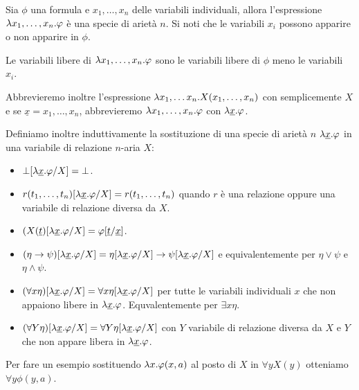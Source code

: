 \documentclass[]{marticle}
\begin{document}
\begin{block}[Definizione]
    Sia $\phi$ una formula e $x_1, \dots, x_n$ delle variabili individuali,
    allora l'espressione $\lambda x_1, \dots, x_n.\varphi$ \`e una specie di ariet\`a
    $n$. Si noti che le variabili $x_i$ possono apparire o non apparire in
    $\phi$. 

    Le variabili libere di $\lambda x_1, \dots, x_n.\varphi$ sono le variabili libere di
    $\phi$ meno le variabili $x_i$.

    Abbrevieremo inoltre l'espressione $\lambda x_1, \dots x_n.X(x_1, \dots, x_n)$
    con semplicemente $X$ e se $\underline{x}=x_1,\dots, x_n$, abbrevieremo $\lambda
    x_1, \dots, x_n.\varphi$ con $\lambda\underline{x}.\varphi$.

    Definiamo inoltre induttivamente la sostituzione di una specie di ariet\`a
    $n$ $\lambda\underline{x}.\varphi$ in una variabile di relazione $n$-aria $X$:
    \begin{itemize}
        \item $\bot[\lambda\underline{x}.\varphi/X] = \bot$.
        \item $r(t_1, \dots, t_n)[\lambda\underline{x}.\varphi/X] = r(t_1, \dots,
            t_n)$ quando $r$ \`e una relazione oppure una variabile di relazione
            diversa da $X$.
        \item $(X(\underline{t})[\lambda\underline{x}.\varphi/X] =
            \varphi[\underline{t}/\underline{x}]$.
        \item $(\eta\rightarrow\psi)[\lambda\underline{x}.\varphi/X] =
            \eta[\lambda\underline{x}.\varphi/X] \rightarrow
            \psi[\lambda\underline{x}.\varphi/X]$
            e equivalentemente per $\eta\lor\psi$ e $\eta\land\psi$.
        \item $(\forall x \eta)[\lambda\underline{x}.\varphi/X] = \forall x
            \eta[\lambda\underline{x}.\varphi/X]$ per tutte le variabili
            individuali $x$ che non appaiono libere in $\lambda\underline{x}.\varphi$.
            Equvalentemente per $\exists x \eta$.
        \item $(\forall Y \eta)[\lambda\underline{x}.\varphi/X] = \forall Y
            \eta[\lambda\underline{x}.\varphi/X]$ con $Y$ variabile di relazione
            diversa da $X$ e $Y$ che non appare libera in
            $\lambda\underline{x}.\varphi$.
    \end{itemize}
\end{block}

Per fare un esempio sostituendo $\lambda x. \varphi(x,a)$ al posto di $X$ in $\forall y
X(y)$ otteniamo $\forall y \phi(y,a)$.
\end{document}
